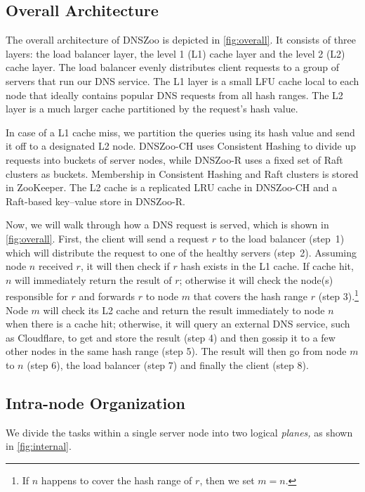 \documentclass[format=sigconf,nonacm,screen]{acmart}
\newcommand{\dnszoo}{\textsf{DNSZoo}}
\newcommand{\dnszooch}{\textsf{DNSZoo-CH}}
\newcommand{\dnszoor}{\textsf{DNSZoo-R}}
\begin{document}
\subsection{Overall Architecture}

The overall architecture of \dnszoo{} is depicted in \autoref{fig:overall}. It consists of three layers: the load balancer layer, the level 1 (L1) cache layer and the level 2 (L2) cache layer. The load balancer evenly distributes client requests to a group of servers that run our DNS service. The L1 layer is a small LFU cache local to each node that ideally contains popular DNS requests from all hash ranges. The L2 layer is a much larger cache partitioned by the request's hash value.

In case of a L1 cache miss, we partition the queries using its hash value and send it off to a designated L2 node. \dnszooch{} uses Consistent Hashing to divide up requests into buckets of server nodes, while \dnszoor{} uses a fixed set of Raft clusters as buckets. Membership in Consistent Hashing and Raft clusters is stored in ZooKeeper. The L2 cache is a replicated LRU cache in \dnszooch{} and a Raft-based key--value store in \dnszoor{}.

Now, we will walk through how a DNS request is served, which is shown in \autoref{fig:overall}. First, the client will send a request $r$ to the load balancer (step~1) which will distribute the request to one of the healthy servers (step~2). Assuming node $n$ received $r$, it will then check if $r$ hash exists in the L1 cache. If cache hit, $n$ will immediately return the result of $r$; otherwise it will check the node(s) responsible for $r$ and forwards $r$ to node $m$ that covers the hash range $r$ (step 3).\footnote{If $n$ happens to cover the hash range of $r$, then we set $m = n$.} Node $m$ will check its L2 cache and return the result immediately to node $n$ when there is a cache hit; otherwise, it will query an external DNS service, such as Cloudflare, to get and store the result (step 4) and then gossip it to a few other nodes in the same hash range (step 5). The result will then go from node $m$ to $n$ (step 6), the load balancer (step 7) and finally the client (step 8).

\subsection{Intra-node Organization}

We divide the tasks within a single server node into two logical \emph{planes,} as shown in \autoref{fig:internal}.
\end{document}
